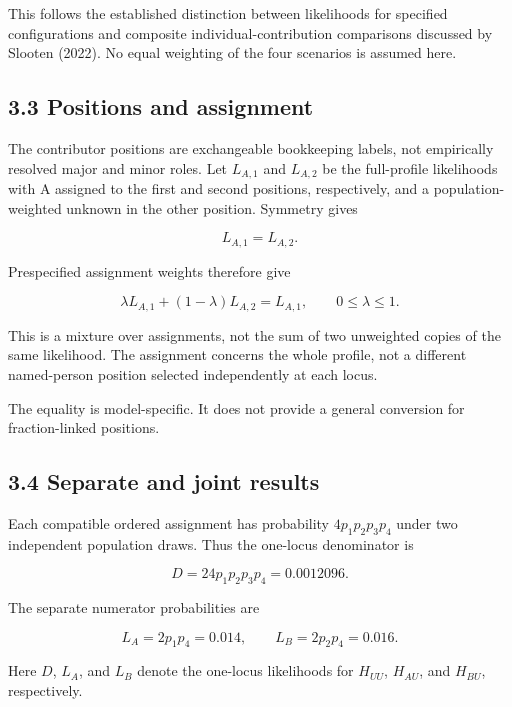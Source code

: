 \documentclass[
]{article}
\begin{document}
This follows the established distinction between likelihoods for
specified configurations and composite individual-contribution
comparisons discussed by Slooten (2022). No equal weighting of the four
scenarios is assumed here.

\subsection{3.3 Positions and
assignment}\label{positions-and-assignment}

The contributor positions are exchangeable bookkeeping labels, not
empirically resolved major and minor roles. Let \(L_{A,1}\) and
\(L_{A,2}\) be the full-profile likelihoods with A assigned to the first
and second positions, respectively, and a population-weighted unknown in
the other position. Symmetry gives

\[
L_{A,1}=L_{A,2}.
\]

Prespecified assignment weights therefore give

\[
\lambda L_{A,1}+(1-\lambda)L_{A,2}=L_{A,1},
\qquad 0\leq\lambda\leq1.
\]

This is a mixture over assignments, not the sum of two unweighted copies
of the same likelihood. The assignment concerns the whole profile, not a
different named-person position selected independently at each locus.

The equality is model-specific. It does not provide a general conversion
for fraction-linked positions.

\subsection{3.4 Separate and joint
results}\label{separate-and-joint-results}

Each compatible ordered assignment has probability \(4p_1p_2p_3p_4\)
under two independent population draws. Thus the one-locus denominator
is

\[
D=24p_1p_2p_3p_4=0.0012096.
\]

The separate numerator probabilities are

\[
L_A=2p_1p_4=0.014,
\qquad
L_B=2p_2p_4=0.016.
\]

Here \(D\), \(L_A\), and \(L_B\) denote the one-locus likelihoods for
\(H_{UU}\), \(H_{AU}\), and \(H_{BU}\), respectively.
\end{document}

